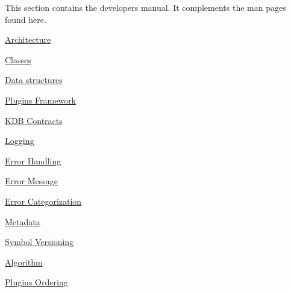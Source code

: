 This section contains the developer\textquotesingle{}s manual. It complements the man pages found here.


\begin{DoxyItemize}
\item \hyperlink{doc_dev_architecture_md}{Architecture}
\item \hyperlink{doc_dev_classes_md}{Classes}
\item \hyperlink{doc_dev_data-structures_md}{Data structures}
\item \hyperlink{doc_dev_plugins-framework_md}{Plugins Framework}
\end{DoxyItemize}


\begin{DoxyItemize}
\item \hyperlink{doc_dev_kdb-contracts_md}{K\+DB Contracts}
\item \hyperlink{doc_dev_logging_md}{Logging}
\item \hyperlink{doc_dev_error-handling_md}{Error Handling}
\item \hyperlink{doc_dev_error-message_md}{Error Message}
\item \hyperlink{doc_dev_error-categorization_md}{Error Categorization}
\item \hyperlink{doc_dev_metadata_md}{Metadata}
\item \hyperlink{doc_dev_symbol-versioning_md}{Symbol Versioning}
\end{DoxyItemize}


\begin{DoxyItemize}
\item \hyperlink{doc_dev_algorithm_md}{Algorithm}
\item \hyperlink{doc_dev_plugins-ordering_md}{Plugins Ordering} 
\end{DoxyItemize}